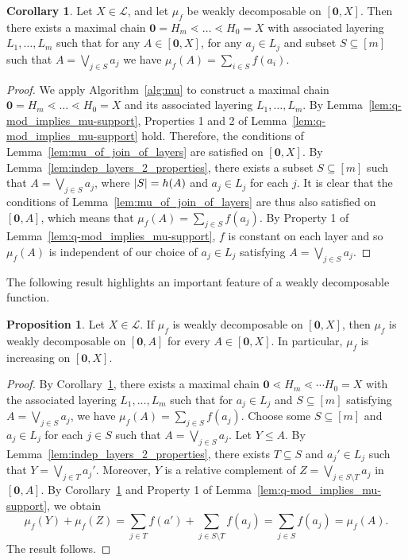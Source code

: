 \documentclass[a4paper,11pt,reqno]{article}
\theoremstyle{definition}
\newtheorem{corollary}[theorem]{{{Corollary}}}
\newtheorem{proposition}[theorem]{{{Proposition}}}
\newcommand{\mL}{\mathcal{L}}
\newcommand{\h}{\textup{h}}
\newcommand{\zero}{{\mathbf{0}}}
\begin{document}
\begin{corollary}\label{cor:mu_q-mod_gives_additive}
    Let $X\in\mathcal{L}$, and let $\mu_f$ be weakly decomposable on $[\zero,X]$. 
    Then there exists a maximal chain $\zero=H_m\lessdot\dots\lessdot H_0=X$ with associated layering $L_1,\dots,L_m$ such that for any $A \in [\zero ,X]$, for any
    $a_j\in L_j$ and subset $S \subseteq [m]$ such that $A=\bigvee_{j \in S} a_j$ we have $\mu_f(A)=\sum_{i\in S}f(a_i)$.
\end{corollary}
\begin{proof}
    We apply Algorithm~\ref{alg:mu} to construct a maximal chain
    $\zero=H_m\lessdot\dots\lessdot H_0=X$ and its associated layering $L_1,\dots,L_m$. 
    By Lemma~\ref{lem:q-mod_implies_mu-support}, Properties 1 and 2 of Lemma~\ref{lem:q-mod_implies_mu-support} hold. Therefore, the conditions of Lemma~\ref{lem:mu_of_join_of_layers} are satisfied on $[\zero, X]$. By Lemma~\ref{lem:indep_layers_2_properties}, there exists a subset $S \subseteq [m]$ such that $A=\bigvee_{j \in S} a_j$, where $|S|=\h(A)$ and $a_j \in L_j$ for each $j$. It is clear that the conditions of Lemma~\ref{lem:mu_of_join_of_layers} are thus also satisfied on $[\zero, A]$, which means that $\mu_f(A)=\sum_{j\in S}f(a_j)$. By Property 1 of Lemma~\ref{lem:q-mod_implies_mu-support}, $f$ is constant on each layer
    and so $\mu_f(A)$ is independent of our choice of $a_j\in L_j$ satisfying $A=\bigvee_{j\in S}a_j$.
\end{proof}

The following result highlights an important feature of a weakly decomposable function.

\begin{proposition}\label{cor:mu_is_increasing}
    Let $X \in \mL$. 
    If $\mu_f$ is weakly decomposable on $[\zero,X]$, then $\mu_f$ is weakly decomposable on $[\zero,A]$
    for every $A \in [\zero,X]$. In particular, $\mu_f$ is increasing on $[\zero,X]$.
\end{proposition}
\begin{proof}
    By Corollary~\ref{cor:mu_q-mod_gives_additive}, there exists a maximal chain $\zero\lessdot H_m\lessdot\cdots H_0=X$ with the associated layering $L_1,\dots,L_m$ such that for $a_j\in L_j$ and $S\subseteq[m]$ satisfying $A=\bigvee_{j\in S}a_j$, we have $\mu_f(A)=\sum_{j\in S}f(a_j)$.
    Choose some $S\subseteq[m]$ and $a_j \in L_j$ for each $j \in S$ such that $A=\bigvee_{j\in S}a_j$.
    Let $Y\leq A$. By Lemma~\ref{lem:indep_layers_2_properties}, there exists $T\subseteq S$ and $a_j'\in L_j$ such that $Y=\bigvee_{j\in T}a_j'$. Moreover, $Y$ is a relative complement of $Z=\bigvee_{j\in S\setminus T}a_j$ in $[\zero, A]$. By Corollary~\ref{cor:mu_q-mod_gives_additive} and Property 1 of Lemma~\ref{lem:q-mod_implies_mu-support}, we obtain
    $$\mu_f(Y)+\mu_f(Z)=\sum_{j\in T}f(a')+\sum_{j\in S\setminus T}f(a_j)=\sum_{j\in S}f(a_j)=\mu_f(A).$$
    The result follows.
\end{proof}
\end{document}
